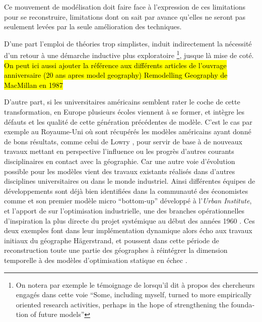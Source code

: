 Ce mouvement de modélisation doit faire face à l'expression de ces limitations pour se reconstruire, limitations dont on sait par avance qu'elles ne seront pas seulement levées par la seule amélioration des techniques.  

D'une part l'emploi de théories trop simplistes, induit indirectement la nécessité d'un retour à une démarche inductive plus exploratoire \footnote{On notera par exemple le témoignage de \textcite{Boyce1988} lorsqu'il dit à propos des chercheurs engagés dans cette voie \foreignquote{english}{Some, including myself, turned to more empirically oriented research activities, perhaps in the hope of strengthening the foundation of future models}}, jusque là mise de coté. \hl{On peut ici aussi ajouter la référence aux différents articles de l'ouvrage anniversaire (20 ans apres model geography) Remodelling Geography de MacMillan en 1987}

D'autre part, si les universitaires américains semblent rater le coche de cette transformation, en Europe plusieurs écoles viennent à se former, et intègre les défauts et les qualité de cette génération précédentes de modèle. C'est le cas par exemple au Royaume-Uni où sont récupérés les modèles américains ayant donné de bons résultats, comme celui de Lowry \autocite{Lowry1964}, pour servir de base à de nouveaux travaux mettant en perspective l'influence ou les progrès d'autres courants disciplinaires en contact avec la géographie. Car une autre voie d'évolution possible pour les modèles vient des travaux existants réalisés dans d'autres disciplines universitaires ou dans le monde industriel. Ainsi différentes équipes de développements sont déjà bien identifiées dans la communauté des économistes comme \textcite{Orcutt1957} et son premier modèle micro \foreignquote{english}{bottom-up} développé à l'\textit{Urban Institute}, et l'apport de \textcite{Forrester1961,Forrester1969} sur l'optimisation industrielle, une des branches opérationnelles d'inspiration la plus directe du projet systémique au début des années 1960 \autocites{Cohen1961}[911]{Shubik1960b}. Ces deux exemples font dans leur implémentation dynamique alors écho aux travaux initiaux du géographe Hägerstrand, et poussent dans cette période de reconstruction toute une partie des géographes à réintégrer la dimension temporelle à des modèles d'optimisation statique en échec \autocite[p295]{Batty1976}.

